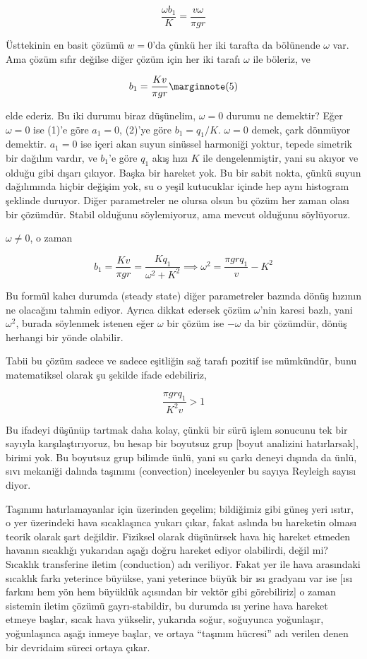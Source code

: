 \documentclass[12pt,fleqn]{article}\usepackage{../../common}
\begin{document}
$$ \frac{\omega b_1}{K} = \frac{v \omega}{\pi gr}$$

Üsttekinin en basit çözümü $w=0$'da çünkü her iki tarafta da bölünende
$\omega$ var. Ama çözüm sıfır değilse diğer çözüm için her iki tarafı
$\omega$ ile böleriz, ve 

$$ 
b_1 = \frac{K v}{\pi gr} 
\mlabel{5} 
$$

elde ederiz. Bu iki durumu biraz düşünelim, $\omega=0$ durumu ne demektir?
Eğer $\omega=0$ ise (1)'e göre $a_1 = 0$, (2)'ye göre $b_1 = q_1 /
K$. $\omega=0$ demek, çark dönmüyor demektir. $a_1=0$ ise içeri akan suyun
sinüssel harmoniği yoktur, tepede simetrik bir dağılım vardır, ve $b_1$'e
göre $q_1$ akış hızı $K$ ile dengelenmiştir, yani su akıyor ve olduğu gibi
dışarı çıkıyor. Başka bir hareket yok. Bu bir sabit nokta, çünkü suyun
dağılımında hiçbir değişim yok, su o yeşil kutucuklar içinde hep aynı
histogram şeklinde duruyor. Diğer parametreler ne olursa olsun bu çözüm her
zaman olası bir çözümdür. Stabil olduğunu söylemiyoruz, ama mevcut olduğunu
söylüyoruz.

$\omega \ne 0$, o zaman 

$$ 
b_1 = \frac{Kv}{\pi gr} = \frac{K q_1}{\omega^2 + K^2} \implies
\omega^2 = \frac{\pi gr q_1}{v} - K^2
$$

Bu formül kalıcı durumda (steady state) diğer parametreler bazında dönüş
hızının ne olacağını tahmin ediyor. Ayrıca dikkat edersek çözüm
$\omega$'nin karesi bazlı, yani $\omega^2$, burada söylenmek istenen eğer
$\omega$ bir çözüm ise $-\omega$ da bir çözümdür, dönüş herhangi bir yönde
olabilir. 

Tabii bu çözüm sadece ve sadece eşitliğin sağ tarafı pozitif ise mümkündür,
bunu matematiksel olarak şu şekilde ifade edebiliriz,

$$\frac{\pi gr q_1}{K^2 v} > 1$$ 

Bu ifadeyi düşünüp tartmak daha kolay, çünkü bir sürü işlem sonucunu tek
bir sayıyla karşılaştırıyoruz, bu hesap bir boyutsuz grup [boyut analizini
hatırlarsak], birimi yok. Bu boyutsuz grup bilimde ünlü, yani su çarkı
deneyi dışında da ünlü, sıvı mekaniği dalında taşınımı (convection)
inceleyenler bu sayıya Reyleigh sayısı diyor.

Taşınımı hatırlamayanlar için üzerinden geçelim; bildiğimiz gibi güneş yeri
ısıtır, o yer üzerindeki hava sıcaklaşınca yukarı çıkar, fakat aslında bu
hareketin olması teorik olarak şart değildir. Fiziksel olarak düşünürsek
hava hiç hareket etmeden havanın sıcaklığı yukarıdan aşağı doğru hareket
ediyor olabilirdi, değil mi? Sıcaklık transferine iletim (conduction) adı
veriliyor. Fakat yer ile hava arasındaki sıcaklık farkı yeterince büyükse,
yani yeterince büyük bir ısı gradyanı var ise [ısı farkını hem yön hem
büyüklük açısından bir vektör gibi görebiliriz] o zaman sistemin iletim
çözümü gayrı-stabildir, bu durumda ısı yerine hava hareket etmeye başlar,
sıcak hava yükselir, yukarıda soğur, soğuyunca yoğunlaşır, yoğunlaşınca
aşağı inmeye başlar, ve ortaya ``taşınım hücresi'' adı verilen denen bir
devridaim süreci ortaya çıkar.
\end{document}
